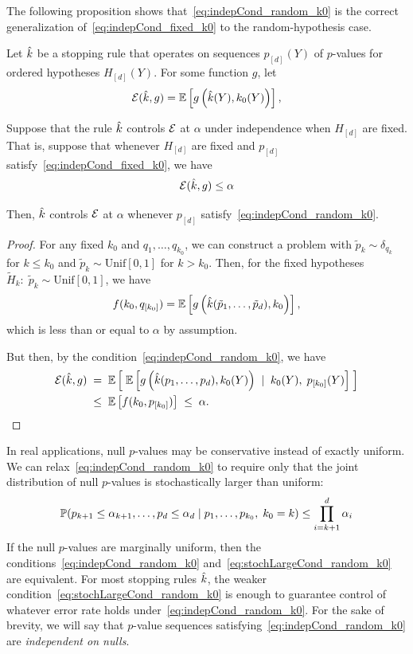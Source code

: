 \documentclass{article}
\begin{document}
The following proposition shows that~\eqref{eq:indepCond_random_k0} is the correct generalization of~\eqref{eq:indepCond_fixed_k0} to the random-hypothesis case.
\begin{proposition}
  Let $\hk$ be a stopping rule that operates on sequences
  $p_{[d]}(Y)$ of $p$-values for ordered hypotheses $H_{[d]}(Y)$. 
  For some function $g$, let 
  \[
  \Err(\hk,g) = \E\left[ g\left(\hk(Y), k_0(Y)\right)\right],
  \]
  
  Suppose that the rule $\hk$ controls $\Err$ at $\alpha$ under
  independence when $H_{[d]}$ are fixed. That is, suppose that
  whenever $H_{[d]}$ are fixed and $p_{[d]}$
  satisfy~\eqref{eq:indepCond_fixed_k0}, we have
  \[
  \Err(\hk, g) \leq \alpha
  \]

  Then, $\hk$ controls $\Err$ at $\alpha$
  whenever $p_{[d]}$ satisfy~\eqref{eq:indepCond_random_k0}.
\end{proposition}
\begin{proof}
  For any fixed $k_0$ and $q_1,\ldots, q_{k_0}$, we can construct a
  problem with $\tilde p_k \sim \delta_{q_k}$ for $k\leq k_0$ and 
  $\tilde p_k \sim \text{Unif}[0,1]$ for $k > k_0$. 
  Then, for the
  fixed hypotheses 
  $\widetilde H_k:\; \tilde p_k \sim \text{Unif}[0,1]$, we have
  \[
  f(k_0, q_{[k_0]}) 
  = \E\left[ g\left(\hk(\tilde p_1, \ldots, \tilde p_d),
      k_0\right) \right],
  \]
  which is less than or equal to $\alpha$ by assumption.

  But then, by the condition~\eqref{eq:indepCond_random_k0}, we have
  \begin{align}
    \Err(\hk,g) &\;=\; \E\left[ \;\E\left[ g\left(\hk(p_1,\ldots, p_d), k_0(Y)\right) \; \mid \; k_0(Y), \; p_{[k_0]}(Y)\right] \; \right]\\
    &\;\leq\; \E\left[f(k_0, p_{[k_0]})\right] \;\leq\; \alpha.
  \end{align}
\end{proof}

In real applications, null $p$-values may be conservative instead of exactly uniform. We can relax~\eqref{eq:indepCond_random_k0} to require only that the joint distribution of null $p$-values is stochastically larger than uniform:
\begin{equation}\label{eq:stochLargeCond_random_k0}
  \P(p_{k+1} \leq \alpha_{k+1}, \ldots, p_d \leq \alpha_d
  \mid p_1, \ldots, p_{k_0}, \; k_0 = k) \leq \prod_{i=k+1}^d \alpha_i
\end{equation}
If the null $p$-values are marginally uniform, then the conditions~\eqref{eq:indepCond_random_k0} and~\eqref{eq:stochLargeCond_random_k0} are equivalent. For most stopping rules $\hk$, the weaker condition~\eqref{eq:stochLargeCond_random_k0} is enough to guarantee control of whatever error rate holds under~\eqref{eq:indepCond_random_k0}. For the sake of brevity, we will say that $p$-value sequences satisfying~\eqref{eq:indepCond_random_k0} are {\em independent on nulls}.
\end{document}
